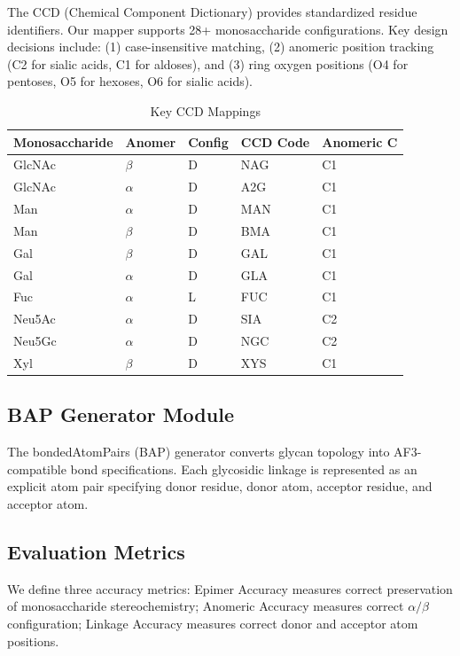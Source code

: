 \documentclass[11pt,a4paper]{article}
\begin{document}
The CCD (Chemical Component Dictionary) provides standardized residue identifiers. Our mapper supports 28+ monosaccharide configurations. Key design decisions include: (1) case-insensitive matching, (2) anomeric position tracking (C2 for sialic acids, C1 for aldoses), and (3) ring oxygen positions (O4 for pentoses, O5 for hexoses, O6 for sialic acids).

\begin{table}[h]
\centering
\caption{Key CCD Mappings}
\begin{tabular}{lllll}
\toprule
Monosaccharide & Anomer & Config & CCD Code & Anomeric C \\
\midrule
GlcNAc & $\beta$ & D & NAG & C1 \\
GlcNAc & $\alpha$ & D & A2G & C1 \\
Man & $\alpha$ & D & MAN & C1 \\
Man & $\beta$ & D & BMA & C1 \\
Gal & $\beta$ & D & GAL & C1 \\
Gal & $\alpha$ & D & GLA & C1 \\
Fuc & $\alpha$ & L & FUC & C1 \\
Neu5Ac & $\alpha$ & D & SIA & C2 \\
Neu5Gc & $\alpha$ & D & NGC & C2 \\
Xyl & $\beta$ & D & XYS & C1 \\
\bottomrule
\end{tabular}
\end{table}

\subsection{BAP Generator Module}

The bondedAtomPairs (BAP) generator converts glycan topology into AF3-compatible bond specifications. Each glycosidic linkage is represented as an explicit atom pair specifying donor residue, donor atom, acceptor residue, and acceptor atom.

\subsection{Evaluation Metrics}

We define three accuracy metrics: Epimer Accuracy measures correct preservation of monosaccharide stereochemistry; Anomeric Accuracy measures correct $\alpha/\beta$ configuration; Linkage Accuracy measures correct donor and acceptor atom positions.
\end{document}
